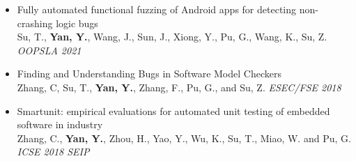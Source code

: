 \begin{itemize}[parsep=0.25ex]
  \item{Fully automated functional fuzzing of Android apps for detecting non-crashing logic bugs\\
  Su, T., \textbf{Yan, Y.}, Wang, J., Sun, J., Xiong, Y., Pu, G., Wang, K., Su, Z. \textsl{OOPSLA 2021}
  }
  \item{Finding and Understanding Bugs in Software Model Checkers\\
  Zhang, C, Su, T., \textbf{Yan, Y.}, Zhang, F., Pu, G., and Su, Z. \textsl{ESEC/FSE 2018}
  }
  \item{Smartunit: empirical evaluations for automated unit testing of embedded software in industry\\
  Zhang, C., \textbf{Yan, Y.}, Zhou, H., Yao, Y., Wu, K., Su, T., Miao, W. and Pu, G. \textsl{ICSE 2018 SEIP}
  }
\end{itemize}